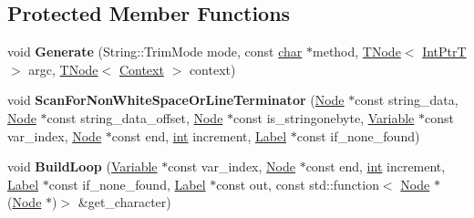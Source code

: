 \subsection*{Protected Member Functions}
\begin{DoxyCompactItemize}
\item 
\mbox{\label{classv8_1_1internal_1_1StringTrimAssembler_ad42cdd233e93ca4df66dcb22806ee24c}} 
void {\bfseries Generate} (String\+::\+Trim\+Mode mode, const \mbox{\hyperlink{classchar}{char}} $\ast$method, \mbox{\hyperlink{classv8_1_1internal_1_1compiler_1_1TNode}{T\+Node}}$<$ \mbox{\hyperlink{structv8_1_1internal_1_1IntPtrT}{Int\+PtrT}} $>$ argc, \mbox{\hyperlink{classv8_1_1internal_1_1compiler_1_1TNode}{T\+Node}}$<$ \mbox{\hyperlink{classv8_1_1internal_1_1Context}{Context}} $>$ context)
\item 
\mbox{\label{classv8_1_1internal_1_1StringTrimAssembler_a06802ea999fe9e129012b2dbbc664bd6}} 
void {\bfseries Scan\+For\+Non\+White\+Space\+Or\+Line\+Terminator} (\mbox{\hyperlink{classv8_1_1internal_1_1compiler_1_1Node}{Node}} $\ast$const string\+\_\+data, \mbox{\hyperlink{classv8_1_1internal_1_1compiler_1_1Node}{Node}} $\ast$const string\+\_\+data\+\_\+offset, \mbox{\hyperlink{classv8_1_1internal_1_1compiler_1_1Node}{Node}} $\ast$const is\+\_\+stringonebyte, \mbox{\hyperlink{classv8_1_1internal_1_1compiler_1_1CodeAssemblerVariable}{Variable}} $\ast$const var\+\_\+index, \mbox{\hyperlink{classv8_1_1internal_1_1compiler_1_1Node}{Node}} $\ast$const end, \mbox{\hyperlink{classint}{int}} increment, \mbox{\hyperlink{classv8_1_1internal_1_1compiler_1_1CodeAssemblerLabel}{Label}} $\ast$const if\+\_\+none\+\_\+found)
\item 
\mbox{\label{classv8_1_1internal_1_1StringTrimAssembler_a52ec125291f04717c641c64dffd4c9a8}} 
void {\bfseries Build\+Loop} (\mbox{\hyperlink{classv8_1_1internal_1_1compiler_1_1CodeAssemblerVariable}{Variable}} $\ast$const var\+\_\+index, \mbox{\hyperlink{classv8_1_1internal_1_1compiler_1_1Node}{Node}} $\ast$const end, \mbox{\hyperlink{classint}{int}} increment, \mbox{\hyperlink{classv8_1_1internal_1_1compiler_1_1CodeAssemblerLabel}{Label}} $\ast$const if\+\_\+none\+\_\+found, \mbox{\hyperlink{classv8_1_1internal_1_1compiler_1_1CodeAssemblerLabel}{Label}} $\ast$const out, const std\+::function$<$ \mbox{\hyperlink{classv8_1_1internal_1_1compiler_1_1Node}{Node}} $\ast$(\mbox{\hyperlink{classv8_1_1internal_1_1compiler_1_1Node}{Node}} $\ast$)$>$ \&get\+\_\+character)
\end{DoxyCompactItemize}
